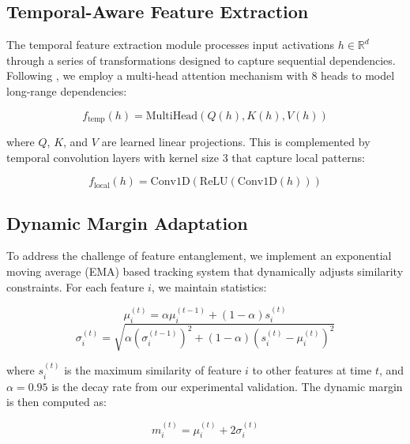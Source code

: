 \documentclass{article} %
\begin{document}
\subsection{Temporal-Aware Feature Extraction}
The temporal feature extraction module processes input activations $h \in \mathbb{R}^d$ through a series of transformations designed to capture sequential dependencies. Following \citet{vaswani2017attention}, we employ a multi-head attention mechanism with 8 heads to model long-range dependencies:

\begin{equation}
    f_{\text{temp}}(h) = \text{MultiHead}(Q(h), K(h), V(h))
\end{equation}

where $Q$, $K$, and $V$ are learned linear projections. This is complemented by temporal convolution layers with kernel size 3 that capture local patterns:

\begin{equation}
    f_{\text{local}}(h) = \text{Conv1D}(\text{ReLU}(\text{Conv1D}(h)))
\end{equation}

\subsection{Dynamic Margin Adaptation}
To address the challenge of feature entanglement, we implement an exponential moving average (EMA) based tracking system that dynamically adjusts similarity constraints. For each feature $i$, we maintain statistics:

\begin{equation}
    \mu_i^{(t)} = \alpha\mu_i^{(t-1)} + (1-\alpha)s_i^{(t)}
\end{equation}
\begin{equation}
    \sigma_i^{(t)} = \sqrt{\alpha(\sigma_i^{(t-1)})^2 + (1-\alpha)(s_i^{(t)} - \mu_i^{(t)})^2}
\end{equation}

where $s_i^{(t)}$ is the maximum similarity of feature $i$ to other features at time $t$, and $\alpha=0.95$ is the decay rate from our experimental validation. The dynamic margin is then computed as:

\begin{equation}
    m_i^{(t)} = \mu_i^{(t)} + 2\sigma_i^{(t)}
\end{equation}

\end{document}
